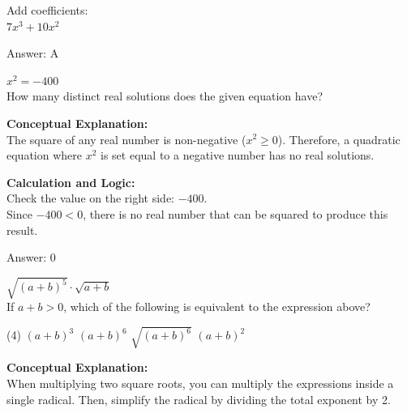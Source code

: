 \documentclass[11pt,paper=a4,answers]{exam}
\begin{document}
\begin{questions}
\begin{solution}
\vspace{10pt}

Add coefficients: \\
$7x^3 + 10x^2$

\vspace{25pt}

Answer: \colorbox{yellow!100}{A}
\end{solution}

\vspace{40pt}

\question
$x^2 = -400$ \\
How many distinct real solutions does the given equation have?

\begin{solution}
\textbf{Conceptual Explanation:} \\
The square of any real number is non-negative ($x^2 \ge 0$). Therefore, a quadratic equation where $x^2$ is set equal to a negative number has no real solutions.

\vspace{20pt}

\textbf{Calculation and Logic:} \\
Check the value on the right side: $-400$. \\
Since $-400 < 0$, there is no real number that can be squared to produce this result.

\vspace{25pt}

Answer: \colorbox{yellow!100}{0}
\end{solution}

\vspace{40pt}

\question
$\sqrt{(a+b)^5} \cdot \sqrt{a+b}$ \\
If $a+b > 0$, which of the following is equivalent to the expression above?
\begin{tasks}(4)
    \task $(a+b)^3$
    \task $(a+b)^6$
    \task $\sqrt{(a+b)^6}$
    \task $(a+b)^2$
\end{tasks}

\begin{solution}
\textbf{Conceptual Explanation:} \\
When multiplying two square roots, you can multiply the expressions inside a single radical. Then, simplify the radical by dividing the total exponent by 2.


\end{solution}
\end{questions}
\end{document}
